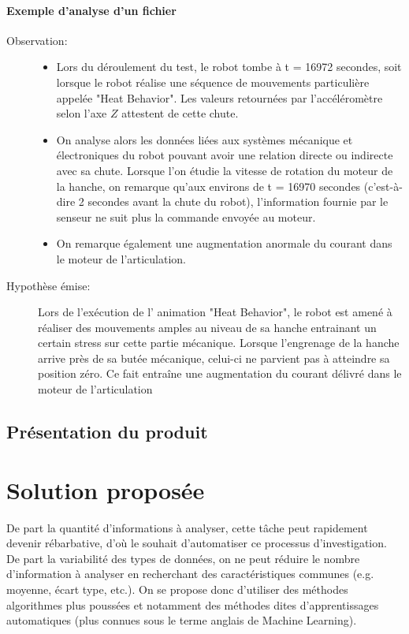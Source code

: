 \paragraph{Exemple d'analyse d'un fichier}
\label{Introduction:Expression du besoin:Exemple d'analyse d'un fichier}
\begin{description}
	\item[Observation:] 
	\begin{itemize}
		\item Lors du déroulement du test, le robot tombe à t = 16972 secondes, soit lorsque le robot réalise une séquence de mouvements particulière appelée "Heat Behavior". Les valeurs retournées par l'accéléromètre selon l'axe $Z$ attestent de cette chute.
		\item On analyse alors les données liées aux systèmes mécanique et électroniques du robot pouvant avoir une relation directe ou indirecte avec sa chute.  Lorsque l'on étudie la vitesse de rotation du moteur de la hanche, on remarque qu'aux environs de  t = 16970 secondes (c'est-à-dire 2 secondes avant la chute du robot), l'information fournie par le senseur ne suit plus la commande  envoyée au moteur.
		\item On remarque également une augmentation anormale du courant dans le moteur de l'articulation. 
	\end{itemize} 
	\item [Hypothèse émise:] Lors de l'exécution de l' animation "Heat Behavior", le robot est amené à réaliser des mouvements amples au niveau de sa hanche entrainant un certain stress sur cette partie mécanique. Lorsque l'engrenage de la hanche arrive près de sa butée mécanique, celui-ci ne parvient pas à atteindre sa position zéro.  Ce fait entraîne  une augmentation du courant délivré dans le moteur de l'articulation
\end{description}

\subsection{Présentation du produit}
\label{Introduction:Expression du besoin:Présentation du produit}

\section{Solution proposée}
De part la quantité d'informations à analyser, cette tâche peut rapidement devenir rébarbative, d'où le souhait d'automatiser ce processus d'investigation. De part la variabilité des types de données, on ne peut réduire le nombre d'information à analyser en recherchant des caractéristiques communes (e.g. moyenne, écart type, etc.). On se propose donc d'utiliser des méthodes algorithmes plus poussées  et notamment des méthodes dites  d'apprentissages automatiques (plus connues sous le terme anglais de Machine Learning). 